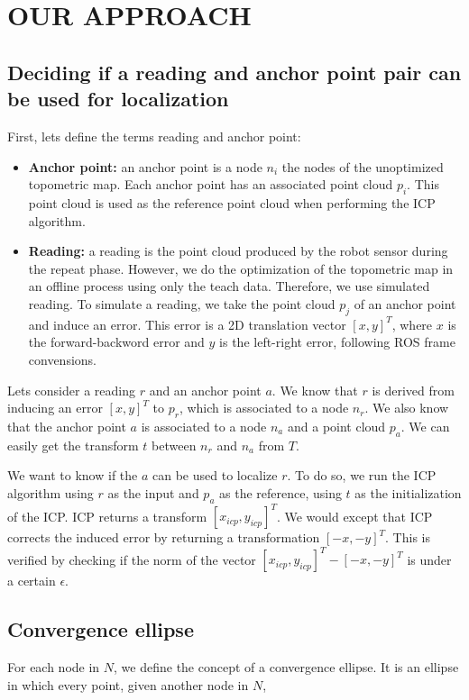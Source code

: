 \documentclass[letterpaper,10 pt,conference]{ieeeconf}
\begin{document}
\section{OUR APPROACH}
\label{approach}

\subsection{Deciding if a reading and anchor point pair can be used for localization}

First, lets define the terms reading and anchor point:

\begin{itemize}
  \item \textbf{Anchor point:} an anchor point is a node $n_i$ the nodes of the unoptimized topometric map. Each
    anchor point has an associated point cloud $p_i$. This point cloud is used as the reference point cloud when performing the
    ICP algorithm.
  \item \textbf{Reading:} a reading is the point cloud produced by the robot sensor during the repeat phase. However,
    we do the optimization of the topometric map in an offline process using only the teach data. Therefore,
    we use simulated reading. To simulate a reading, we take the point cloud $p_j$ of an anchor point and induce an
    error. This error is a 2D translation vector $[x, y]^T$, where $x$ is the forward-backword error and $y$ is the left-right error,
    following ROS frame convensions.
\end{itemize}

Lets consider a reading $r$ and an anchor point $a$. We know that $r$ is derived from inducing an error $[x, y]^T$ to $p_r$, which is associated to a node $n_r$.
We also know that the anchor point $a$ is associated to a node $n_a$ and a point cloud $p_a$. We can easily get the transform $t$ between $n_r$ and $n_a$ from $T$.


We want to know if the $a$ can be used to localize $r$. To do so, we run the ICP algorithm using $r$ as the input and $p_a$ as the reference, using $t$
as the initialization of the ICP. ICP returns a transform $[x_{icp}, y_{icp}]^T$. We would except that ICP corrects the induced error by returning
a transformation $[-x, -y]^T$. This is verified by checking if the norm of the vector $[x_{icp}, y_{icp}]^T - [-x, -y]^T$ is under a certain $\epsilon$.


\subsection{Convergence ellipse}
For each node in $N$, we define the concept of a convergence ellipse.
It is an ellipse in which every point, given another node in $N$,
\end{document}
